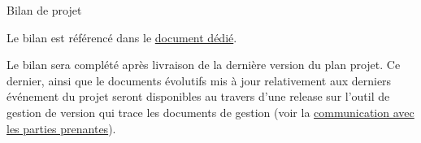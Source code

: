 \documentclass[]{article}
\begin{document}
{    \begin{section}{\label{sec:Bilan de projet}Bilan de projet}
     \begin{subsection}{\label{sec:Référencement du bilan}}
         Le bilan est référencé dans le \href{documents/Bilan_de_projet.pdf}{document dédié}.
     \end{subsection}

     \begin{subsection}{\label{sec:Production du bilan}}
         Le bilan sera complété après livraison de la dernière version du plan projet.
         Ce dernier, ainsi que le documents évolutifs mis à jour relativement aux derniers événement du projet seront disponibles au travers d’une release sur l’outil de gestion de version qui trace les documents de gestion (voir la \hyperref[sec:Communication avec les parties prenantes]{communication avec les parties prenantes}).
     \end{subsection}
    \end{section}
}
\end{document}
